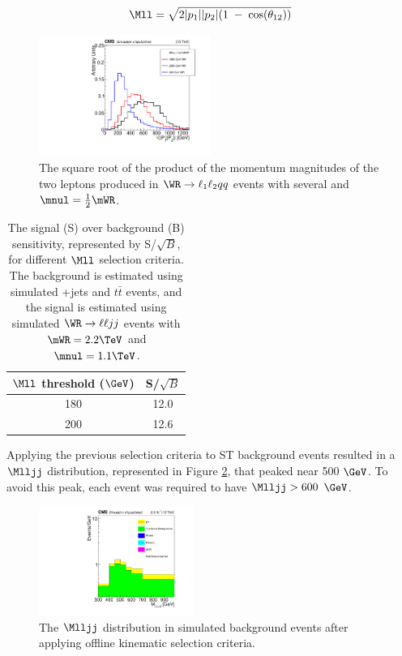 \begin{equation}
	\Mll = \sqrt{2|p_{1}||p_{2}|(1\thickspace - \thickspace \cos(\theta_{12}))}
	\label{eq:dileptMass}
\end{equation}

\begin{figure}[h]
	\centering
	\includegraphics[width=0.5\textwidth]{figures/sqrtProdGenLeptMomentumMag_several_MWR_and_MNu_private.pdf}
	\caption{The square root of the product of the momentum magnitudes of the two leptons produced in $\WR \rightarrow \ell_{1}\ell_{2} qq$ 
		events with several \mWR and $\mnul = \frac{1}{2}\mWR$.}
	\label{fig:wrLeptSqrtMomMagVarMNu}
\end{figure}

\begin{table}[h]
	\caption{The signal (S) over background (B) sensitivity, represented by S/$\sqrt{B}$, for different $\Mll$ selection 
		criteria.  The background is estimated using simulated \DY+jets and $t\bar{t}$ events, and the 
		signal is estimated using simulated $\WR \rightarrow \ell\ell jj$ events with $\mWR = 2.2 \TeV$ and $\mnul = 1.1 \TeV$.}
	\label{tab:lowerMllCut}
	\centering
	\begin{tabular}{c|c}
		$\Mll$ threshold ($\GeV$) & S/$\sqrt{B}$ \\  \hline
		180 &  12.0  \\
		200 &  12.6  \\ \hline
	\end{tabular}
\end{table}

Applying the previous selection criteria to ST background events resulted in a $\Mlljj$ distribution, represented in Figure 
\ref{fig:sculptedMlljj}, that peaked near 500 $\GeV$.  To avoid this peak, each event was required to have $\Mlljj > 600$ $\GeV$.

\begin{figure}[h]
	\centering
	\includegraphics[width=0.45\textwidth]{figures/Mlljj_varBins_SignalRegion_EEChannelBkgndMC_DYMadHTAndIncl_TTBarFromData_log.pdf}
	\caption{The $\Mlljj$ distribution in simulated background events after applying offline kinematic selection criteria.}
	\label{fig:sculptedMlljj}
\end{figure}

